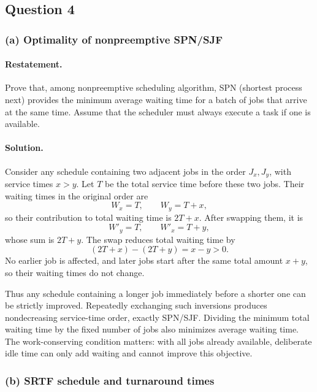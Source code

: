 \subsection*{Question 4}

\subsubsection*{(a) Optimality of nonpreemptive SPN/SJF}

\paragraph{Restatement.}
Prove that, among nonpreemptive scheduling algorithm, SPN (shortest
process next) provides the minimum average waiting time for a batch of
jobs that arrive at the same time.  Assume that the scheduler must
always execute a task if one is available.

\paragraph{Solution.}
Consider any schedule containing two adjacent jobs in the order
\(J_x,J_y\), with service times \(x>y\).  Let \(T\) be the total service
time before these two jobs.  Their waiting times in the original order
are
\[
W_x=T,\qquad W_y=T+x,
\]
so their contribution to total waiting time is \(2T+x\).  After
swapping them, it is
\[
W'_y=T,\qquad W'_x=T+y,
\]
whose sum is \(2T+y\).  The swap reduces total waiting time by
\[
(2T+x)-(2T+y)=x-y>0.
\]
No earlier job is affected, and later jobs start after the same total
amount \(x+y\), so their waiting times do not change.

Thus any schedule containing a longer job immediately before a shorter
one can be strictly improved.  Repeatedly exchanging such inversions
produces nondecreasing service-time order, exactly SPN/SJF.  Dividing
the minimum total waiting time by the fixed number of jobs also
minimizes average waiting time.  The work-conserving condition matters:
with all jobs already available, deliberate idle time can only add
waiting and cannot improve this objective.

\subsubsection*{(b) SRTF schedule and turnaround times}


